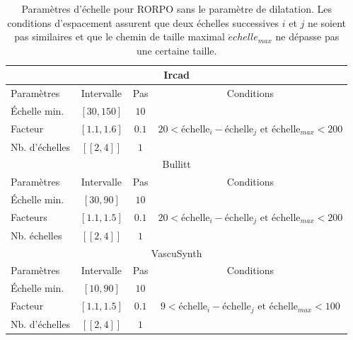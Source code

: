 \begin{table}[!ht]
  \caption{ Paramètres d'échelle pour RORPO sans le paramètre de dilatation. Les conditions d'espacement assurent que deux échelles successives $i$ et $j$  ne soient pas similaires et que le chemin de taille maximal $\acute{e}chelle_{max}$ ne dépasse pas une certaine taille.}
  \label{tab:SS_interval_RORPO}
  \begin{center}
    \begin{tabular}{  l  c  c  c }
      \hline
      \multicolumn{4}{c}{Ircad}\\
      \hline
      Paramètres & Intervalle & Pas & Conditions \\
      \hline
      Échelle min. & $[30,150]$ & $10$ & \\
      Facteur & $[1.1,1.6]$ & $0.1$ & $20 < \textrm{échelle}_{i} - \textrm{échelle}_{j} \textrm{~et~} \textrm{échelle}_{max} < 200 $ \\ 
      Nb. d'échelles & $[\![2,4]\!]$ & $1$ & \\
      \hline
      \hline
      \multicolumn{4}{c}{Bullitt}\\
      \hline
      Paramètres & Intervalle & Pas & Conditions \\
      \hline
      Échelle min. & $[30,90]$ & $10$ & \\
      
      Facteurs & $[1.1,1.5]$  & $0.1$ & $ 20 < \textrm{échelle}_{i} - \textrm{échelle}_{j} \textrm{~et~} \textrm{échelle}_{max} < 200$ \\
      Nb. échelles & $[\![2,4]\!]$ & $1$ & \\
      \hline
      \hline
      \multicolumn{4}{c}{VascuSynth}\\
      \hline
      Paramètres & Intervalle & Pas & Conditions \\
      \hline
      Échelle min. & $[10,90]$ & $10$ & \\
      
      Facteur & $[1.1,1.5]$  &  $0.1$ & $ 9 < \textrm{échelle}_{i} - \textrm{échelle}_{j} \textrm{~et~} \textrm{échelle}_{max} < 100$ \\
      
      Nb. d'échelles & $[\![2,4]\!]$ & $1$ & \\
      \hline
    \end{tabular}
  \end{center}
\end{table}
